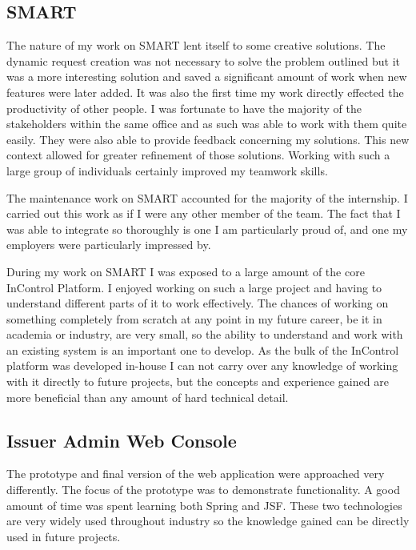 \documentclass[a4paper, 11pt, titlepage]{article}
\begin{document}
\subsection{SMART}

The nature of my work on SMART lent itself to some creative solutions. The dynamic request creation was not necessary to solve the problem outlined but it was a more interesting solution and saved a significant amount of work when new features were later added. It was also the first time my work directly effected the productivity of other people. I was fortunate to have the majority of the stakeholders within the same office and as such was able to work with them quite easily. They were also able to provide feedback concerning my solutions. This new context allowed for greater refinement of those solutions. Working with such a large group of individuals certainly improved my teamwork skills.

The maintenance work on SMART accounted for the majority of the internship. I carried out this work as if I were any other member of the team. The fact that I was able to integrate so thoroughly is one I am particularly proud of, and one my employers were particularly impressed by.

During my work on SMART I was exposed to a large amount of the core InControl Platform. I enjoyed working on such a large project and having to understand different parts of it to work effectively. The chances of working on something completely from scratch at any point in my future career, be it in academia or industry, are very small, so the ability to understand and work with an existing system is an important one to develop. As the bulk of the InControl platform was developed in-house I can not carry over any knowledge of working with it directly to future projects, but the concepts and experience gained are more beneficial than any amount of hard technical detail.

\subsection{Issuer Admin Web Console}

The prototype and final version of the web application were approached very differently. The focus of the prototype was to demonstrate functionality. A good amount of time was spent learning both Spring and JSF. These two technologies are very widely used throughout industry so the knowledge gained can be directly used in future projects.
\end{document}
